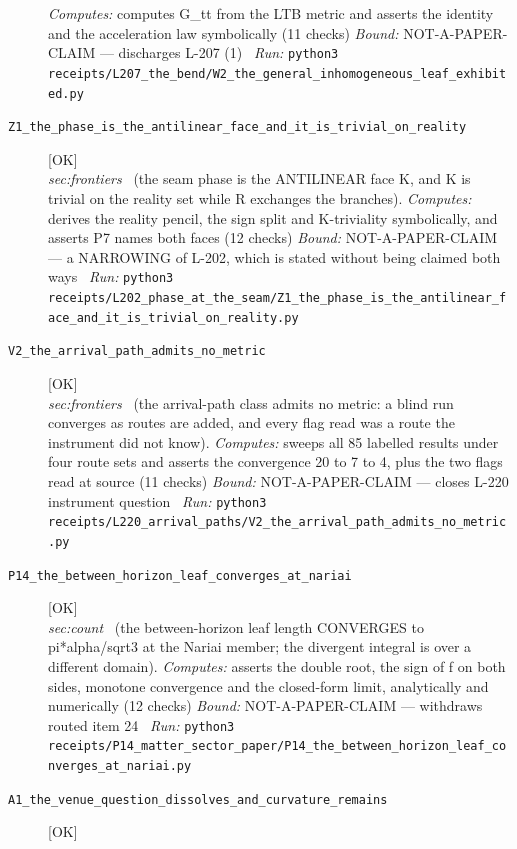 \begin{description}
\emph{Computes:} computes G\_tt from the LTB metric and asserts the identity and the acceleration law symbolically (11 checks)
 \emph{Bound:} NOT-A-PAPER-CLAIM --- discharges L-207 (1)
\ \emph{Run:} \texttt{python3 receipts/L207\_the\_bend/W2\_the\_general\_inhomogeneous\_leaf\_exhibited.py}
\item[\label{rcpt:Z1_the_phase_is_the_antilinear_face_and_it_is_trivial_on_reality}\texttt{Z1\_the\_phase\_is\_the\_antilinear\_face\_and\_it\_is\_trivial\_on\_reality}]\hfill\textsf{[OK]}\\
\textit{sec:frontiers} \ (the seam phase is the ANTILINEAR face K, and K is trivial on the reality set while R exchanges the branches). 
\emph{Computes:} derives the reality pencil, the sign split and K-triviality symbolically, and asserts P7 names both faces (12 checks)
 \emph{Bound:} NOT-A-PAPER-CLAIM --- a NARROWING of L-202, which is stated without being claimed both ways
\ \emph{Run:} \texttt{python3 receipts/L202\_phase\_at\_the\_seam/Z1\_the\_phase\_is\_the\_antilinear\_face\_and\_it\_is\_trivial\_on\_reality.py}
\item[\label{rcpt:V2_the_arrival_path_admits_no_metric}\texttt{V2\_the\_arrival\_path\_admits\_no\_metric}]\hfill\textsf{[OK]}\\
\textit{sec:frontiers} \ (the arrival-path class admits no metric: a blind run converges as routes are added, and every flag read was a route the instrument did not know). 
\emph{Computes:} sweeps all 85 labelled results under four route sets and asserts the convergence 20 to 7 to 4, plus the two flags read at source (11 checks)
 \emph{Bound:} NOT-A-PAPER-CLAIM --- closes L-220 instrument question
\ \emph{Run:} \texttt{python3 receipts/L220\_arrival\_paths/V2\_the\_arrival\_path\_admits\_no\_metric.py}
\item[\label{rcpt:P14_the_between_horizon_leaf_converges_at_nariai}\texttt{P14\_the\_between\_horizon\_leaf\_converges\_at\_nariai}]\hfill\textsf{[OK]}\\
\textit{sec:count} \ (the between-horizon leaf length CONVERGES to pi*alpha/sqrt3 at the Nariai member; the divergent integral is over a different domain). 
\emph{Computes:} asserts the double root, the sign of f on both sides, monotone convergence and the closed-form limit, analytically and numerically (12 checks)
 \emph{Bound:} NOT-A-PAPER-CLAIM --- withdraws routed item 24
\ \emph{Run:} \texttt{python3 receipts/P14\_matter\_sector\_paper/P14\_the\_between\_horizon\_leaf\_converges\_at\_nariai.py}
\item[\label{rcpt:A1_the_venue_question_dissolves_and_curvature_remains}\texttt{A1\_the\_venue\_question\_dissolves\_and\_curvature\_remains}]\hfill\textsf{[OK]}\\

\end{description}
